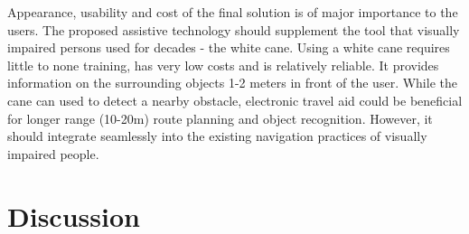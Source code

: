 \documentclass[10pt,conference,compsocconf]{IEEEtran}
\begin{document}
Appearance, usability and cost of the final solution is of major importance to the users. The proposed assistive technology should supplement the tool that visually impaired persons used for decades - the white cane. Using a white cane requires little to none training, has very low costs and is relatively reliable. It provides information on the surrounding objects 1-2 meters in front of the user. While the cane can used to detect a nearby obstacle, electronic travel aid could be beneficial for longer range (10-20m) route planning and object recognition. However, it should integrate seamlessly into the existing navigation practices of visually impaired people. 


 




\section{Discussion}
\label{sec:discussion}
\end{document}
